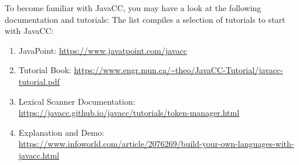 \begin{questions}


To become familiar with JavaCC, you may have a look at the following documentation and tutorials: 
The list compiles a selection of tutorials to start with JavaCC:
\begin{enumerate}[
	start=1, 
	label={\upshape\bfseries D\arabic*},
	wide = 0.4cm, 
	leftmargin = 3em
	]
	\item JavaPoint: \url{https://www.javatpoint.com/javacc}
	\item Tutorial Book: 
	\url{https://www.engr.mun.ca/~theo/JavaCC-Tutorial/javacc-tutorial.pdf}
	\item Lexical Scanner Documentation: 
	\url{https://javacc.github.io/javacc/tutorials/token-manager.html}
	\item Explanation and Demo:\\ \url{https://www.infoworld.com/article/2076269/build-your-own-languages-with-javacc.html}
\end{enumerate}

\end{questions}
